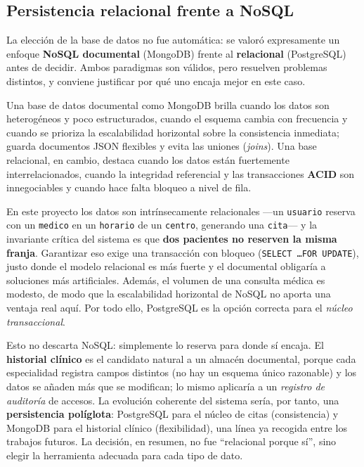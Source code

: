 \documentclass[12pt,a4paper]{report}
\begin{document}
\subsection{Persistencia relacional frente a NoSQL}

La elección de la base de datos no fue automática: se valoró expresamente un enfoque \textbf{NoSQL documental} (MongoDB) frente al \textbf{relacional} (PostgreSQL) antes de decidir. Ambos paradigmas son válidos, pero resuelven problemas distintos, y conviene justificar por qué uno encaja mejor en este caso.

Una base de datos documental como MongoDB brilla cuando los datos son heterogéneos y poco estructurados, cuando el esquema cambia con frecuencia y cuando se prioriza la escalabilidad horizontal sobre la consistencia inmediata; guarda documentos JSON flexibles y evita las uniones (\emph{joins}). Una base relacional, en cambio, destaca cuando los datos están fuertemente interrelacionados, cuando la integridad referencial y las transacciones \textbf{ACID} son innegociables y cuando hace falta bloqueo a nivel de fila.

En este proyecto los datos son intrínsecamente relacionales —un \texttt{usuario} reserva con un \texttt{medico} en un \texttt{horario} de un \texttt{centro}, generando una \texttt{cita}— y la invariante crítica del sistema es que \textbf{dos pacientes no reserven la misma franja}. Garantizar eso exige una transacción con bloqueo (\texttt{SELECT \ldots FOR UPDATE}), justo donde el modelo relacional es más fuerte y el documental obligaría a soluciones más artificiales. Además, el volumen de una consulta médica es modesto, de modo que la escalabilidad horizontal de NoSQL no aporta una ventaja real aquí. Por todo ello, PostgreSQL es la opción correcta para el \emph{núcleo transaccional}.

Esto no descarta NoSQL: simplemente lo reserva para donde sí encaja. El \textbf{historial clínico} es el candidato natural a un almacén documental, porque cada especialidad registra campos distintos (no hay un esquema único razonable) y los datos se añaden más que se modifican; lo mismo aplicaría a un \emph{registro de auditoría} de accesos. La evolución coherente del sistema sería, por tanto, una \textbf{persistencia políglota}: PostgreSQL para el núcleo de citas (consistencia) y MongoDB para el historial clínico (flexibilidad), una línea ya recogida entre los trabajos futuros. La decisión, en resumen, no fue ``relacional porque sí'', sino elegir la herramienta adecuada para cada tipo de dato.
\end{document}
